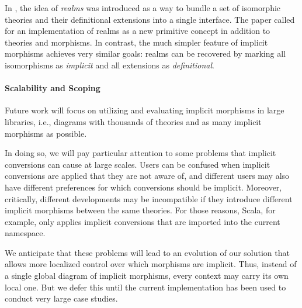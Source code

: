 In \cite{realms}, the idea of \emph{realms} was introduced as a way to bundle a set of isomorphic theories and their definitional extensions into a single interface.
The paper called for an implementation of realms as a new primitive concept in addition to theories and morphisms.
In contrast, the much simpler feature of implicit morphisms achieves very similar goals: realms can be recovered by marking all isomorphisms as \emph{implicit} and all extensions as \emph{definitional}.

%

\paragraph{Scalability and Scoping}
Future work will focus on utilizing and evaluating implicit morphisms in large libraries, i.e., diagrams with thousands of theories and as many implicit morphisms as possible.

In doing so, we will pay particular attention to some problems that implicit conversions can cause at large scales.
Users can be confused when implicit conversions are applied that they are not aware of, and different users may also have different preferences for which conversions should be implicit.
Moreover, critically, different developments may be incompatible if they introduce different implicit morphisms between the same theories.
For those reasons, Scala, for example, only applies implicit conversions that are imported into the current namespace.

We anticipate that these problems will lead to an evolution of our solution that allows more localized control over which morphisms are implicit.
Thus, instead of a single global diagram of implicit morphisms, every context may carry its own local one.
But we defer this until the current implementation has been used to conduct very large case studies.



